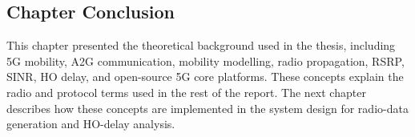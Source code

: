 \subsection{Chapter Conclusion}

This chapter presented the theoretical background used in the thesis, including 5G mobility, A2G communication, mobility modelling, radio propagation, RSRP, SINR, HO delay, and open-source 5G core platforms. These concepts explain the radio and protocol terms used in the rest of the report. The next chapter describes how these concepts are implemented in the system design for radio-data generation and HO-delay analysis.
